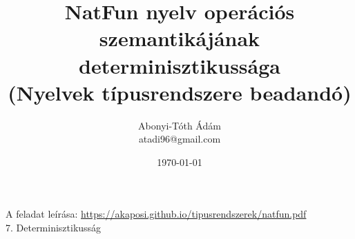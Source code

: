 \documentclass[a4paper]{article}
\numberwithin{equation}{section}
\theoremstyle{magyar}
\begin{document}
\onehalfspacing


\title{NatFun nyelv operációs szemantikájának determinisztikussága \\ (Nyelvek típusrendszere beadandó)}
\author{Abonyi-Tóth Ádám \\ atadi96@gmail.com}
\date{\today}
\maketitle
\thispagestyle{empty}

\vspace{25em}

\newpage

A feladat leírása: \href{https://akaposi.github.io/tipusrendszerek/natfun.pdf}{https://akaposi.github.io/tipusrendszerek/natfun.pdf}
\\ 7. Determinisztikusság
\end{document}
